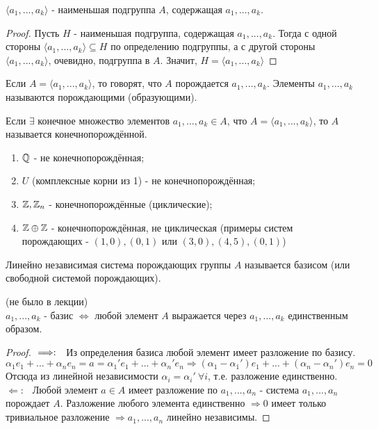 \begin{subtheorem}
    $\langle a_1,...,a_k \rangle$ - наименьшая подгруппа $A$, содержащая $a_1,...,a_k$. 
\end{subtheorem}
\begin{proof}
    Пусть $H$ - наименьшая подгруппа, содержащая $a_1,...,a_k$. Тогда с одной стороны $\langle a_1,...,a_k \rangle \subseteq H$ по определению подгруппы, а с другой стороны $\langle a_1,...,a_k\rangle$, очевидно, подгруппа в $A$. Значит, $H = \langle a_1,...,a_k \rangle$ 
\end{proof}
\begin{definition}
    Если $A = \langle a_1,...,a_k \rangle$, то говорят, что $A$ порождается $a_1,...,a_k$. Элементы $a_1,...,a_k$ называются порождающими (образующими).
\end{definition}
\begin{definition}
    Если $\exists$ конечное множество элементов $a_1,...,a_k \in A$, что $A = \langle a_1,...,a_k \rangle$, то $A$ называется конечнопорождённой.
\end{definition}
\begin{examples}\tab
    \begin{enumerate}
        \item $\mathbb{Q}$ - не конечнопорождённая;
        \item $U$ (комплексные корни из 1) - не конечнопорождённая;
        \item $\mathbb{Z}, \mathbb{Z}_n$ - конечнопорождённые (циклические);
        \item $\mathbb{Z} \oplus \mathbb{Z}$ - конечнопорождённая, не циклическая (примеры систем порождающих - $(1, 0), (0, 1)$ или $(3, 0), (4, 5), (0, 1)$) 
    \end{enumerate}
\end{examples}
\begin{definition}
    Линейно независимая система порождающих группы $A$ называется базисом (или свободной системой порождающих).
\end{definition}
\begin{subtheorem} (не было в лекции)\\
    $a_1,...,a_k$ - базис $\Longleftrightarrow$ любой элемент $A$ выражается через $a_1,...,a_k$ единственным образом.
\end{subtheorem}
\begin{proof}
    $ \\ \Longrightarrow: \ \ $ Из определения базиса любой элемент имеет разложение по базису.
    \[\alpha_1e_1 + ... + \alpha_ne_n = a = \alpha_1'e_1 + ... + \alpha_n'e_n \Longrightarrow (\alpha_1 - \alpha_1')e_1 + ... + (\alpha_n - \alpha_n')e_n = 0\] 
    Отсюда из линейной независимости $\alpha_i = \alpha_i' \ \forall i$, т.е. разложение единственно.\\
    $\Longleftarrow: \ \ $ Любой элемент $a \in A$ имеет разложение по $a_1,...,a_n$ - система $a_1,...,a_n$ порождает $A$. Разложение любого элемента единственно $\Longrightarrow 0$ имеет только тривиальное разложение $\Longrightarrow a_1,...,a_n$ линейно независимы. 
\end{proof}
